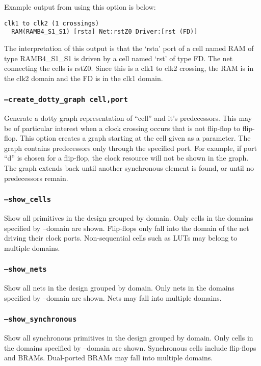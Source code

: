 Example output from using this option is below:
\begin{verbatim}
clk1 to clk2 (1 crossings)
  RAM(RAMB4_S1_S1) [rsta] Net:rstZ0 Driver:[rst (FD)]
\end{verbatim}
The interpretation of this output is that the `rsta' port of a cell named RAM of
type RAMB4\_S1\_S1 is driven by a cell named `rst' of type FD.  The net
connecting the cells is rstZ0. Since this is a clk1 to clk2 crossing, the RAM is
in the clk2 domain and the FD is in the clk1 domain.

\subsubsection{\texttt{--create\_dotty\_graph cell,port}}
Generate a dotty graph representation of ``cell'' and it's predecessors.  This
may be of particular interest when a clock crossing occurs that is not flip-flop
to flip-flop. This option creates a graph starting at the cell given as a
parameter.  The graph contains predecessors only through the specified port. 
For example, if port ``d'' is chosen for a flip-flop, the clock resource will
not be shown in the graph.  The graph extends back until another synchronous
element is found, or until no predecessors remain.

\subsubsection{\texttt{--show\_cells}}
Show all primitives in the design grouped by domain. Only cells in the domains
specified by --domain are shown. Flip-flops only fall into the domain of the net
driving their clock ports.  Non-sequential cells such as LUTs may belong to
multiple domains.

\subsubsection{\texttt{--show\_nets}}
Show all nets in the design grouped by domain. Only nets in the domains 
specified by --domain are shown. Nets may fall into multiple domains.

\subsubsection{\texttt{--show\_synchronous}}
Show all synchronous primitives in the design grouped by domain. Only cells in
the domains specified by --domain are shown. Synchronous cells include
flip-flops and BRAMs.  Dual-ported BRAMs may fall into multiple domains.

